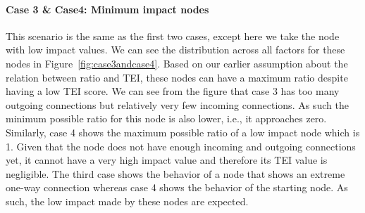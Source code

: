 \paragraph{Case 3 \& Case4: Minimum impact nodes}This scenario is the same as
the first two cases, except here we take the node with low impact values. We
can see the distribution across all factors for these nodes in
Figure~\ref{fig:case3andcase4}. Based on our earlier assumption about the
relation between ratio and \ac{TEI}, these nodes can have a maximum ratio
despite having a low \ac{TEI} score. We can see from the figure that case 3 has
too many outgoing connections but relatively very few incoming connections. As
such the minimum possible ratio for this node is also lower, i.e., it
approaches zero. Similarly, case 4 shows the maximum possible ratio of a low
impact node which is 1. Given that the node does not have enough incoming and
outgoing connections yet, it cannot have a very high impact value and therefore
its \ac{TEI} value is negligible. The third case shows the behavior of a node
that shows an extreme one-way connection whereas case 4 shows the behavior of
the starting node. As such, the low impact made by these nodes are expected. 

%





